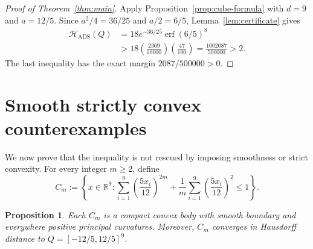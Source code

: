 \documentclass[11pt,reqno]{amsart}
\newtheorem{proposition}[theorem]{Proposition}
\theoremstyle{remark}
\DeclareMathOperator{\erf}{erf}
\newcommand{\R}{\mathbb{R}}
\newcommand{\Hads}{\mathcal{H}_{\mathrm{ADS}}}
\begin{document}
\begin{proof}[Proof of Theorem~\ref{thm:main}]
Apply Proposition~\ref{prop:cube-formula} with \(d=9\) and \(a=12/5\).
Since \(a^2/4=36/25\) and \(a/2=6/5\), Lemma~\ref{lem:certificate}
gives
\begin{align*}
 \Hads(Q)
 &=18e^{-36/25}\erf(6/5)^8\\
 &>18\left(\frac{2369}{10000}\right)
       \left(\frac{47}{100}\right)
 =\frac{1002087}{500000}>2.
\end{align*}
The last inequality has the exact margin
\(2087/500000>0\).
\end{proof}

\section{Smooth strictly convex counterexamples}

We now prove that the inequality is not rescued by imposing smoothness or
strict convexity.  For every integer \(m\ge2\), define
\begin{equation}\label{eq:smooth-approximation}
 C_m:=\left\{x\in\R^9:
 \sum_{i=1}^9\left(\frac{5x_i}{12}\right)^{2m}
 +\frac1m\sum_{i=1}^9\left(\frac{5x_i}{12}\right)^2
 \le1\right\}.
\end{equation}

\begin{proposition}\label{prop:approximation}
Each \(C_m\) is a compact convex body with smooth boundary and everywhere
positive principal curvatures.  Moreover, \(C_m\) converges in Hausdorff
distance to \(Q=[-12/5,12/5]^9\).
\end{proposition}
\end{document}

